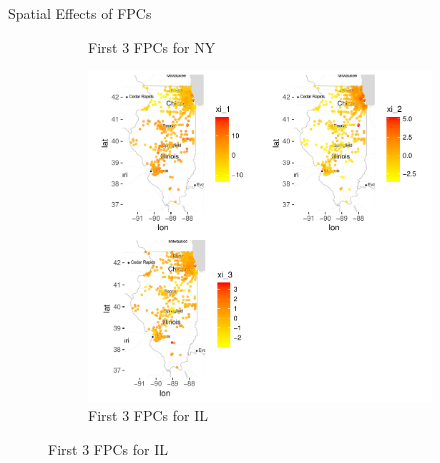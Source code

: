 \documentclass[final]{beamer}
\newlength{\colwidth}
\begin{document}
\begin{frame}[t]
\begin{columns}[t]
\begin{column}{\colwidth}
\begin{block}{Spatial Effects of FPCs}
\begin{figure}[h]
\begin{subfigure}{0.52\textwidth}
    \caption{First 3 FPCs for NY}
  \end{subfigure}%
      \begin{subfigure}{0.52\textwidth}
    \centering
    \includegraphics[width=1.05\linewidth]{figure/fpc_IL.pdf}
    \caption{First 3 FPCs for IL}
  \end{subfigure}%
\end{figure}


\end{block}
\end{column}
\end{columns}
\end{frame}
\end{document}
